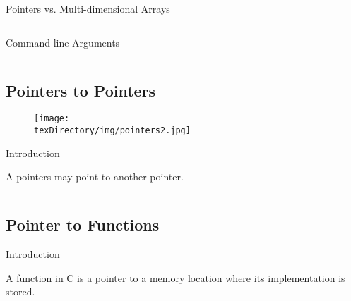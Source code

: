 \documentclass[compress]{beamer}
\begin{document}
\begin{slide}
	\begin{block}{Pointers vs. Multi-dimensional Arrays}

	\inputminted[fontsize=\footnotesize, firstline=10, linenos]{c}{
		\resDirectory/ls12-array4.c
	}

	\end{block}
\end{slide}

\begin{slide}
	\begin{block}{Command-line Arguments}

	\inputminted[fontsize=\footnotesize, firstline=10, linenos]{c}{
		\resDirectory/ls12-cmdargs.c
	}

	\end{block}
\end{slide}

\subsection{Pointers to Pointers}

\begin{slide}
	\begin{figure}
	\texttt{[image: \\texDirectory/img/pointers2.jpg]}
	\end{figure}
\end{slide}

\begin{slide}
	\begin{block}{Introduction}

	A pointers may point to another pointer.

	\inputminted[fontsize=\footnotesize, firstline=10, linenos]{c}{
		\resDirectory/ls12-ptrptr1.c
	}

	\end{block}
\end{slide}

\subsection{Pointer to Functions}

\begin{slide}
	\begin{block}{Introduction}

	A function in C is a pointer to a memory location where its implementation is stored.

	\end{block}
\end{slide}
\end{document}
